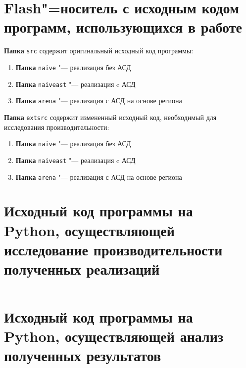 \section{Flash"=носитель с исходным кодом программ, использующихся в работе}
{\raggedright
\textbf{Папка} \texttt{src} содержит оригинальный исходный код программы:
}

\begin{enumerate}
    \item[] \textbf{Папка} \texttt{naive} "--- реализация без АСД
    \item[] \textbf{Папка} \texttt{naiveast} "--- реализация c АСД
    \item[] \textbf{Папка} \texttt{arena} "--- реализация с АСД на основе 
    региона
\end{enumerate}

{\raggedright
\textbf{Папка} \texttt{extsrc} содержит измененный исходный код, необходимый для
исследования производительности:
}

\begin{enumerate}
    \item[] \textbf{Папка} \texttt{naive} "--- реализация без АСД
    \item[] \textbf{Папка} \texttt{naiveast} "--- реализация c АСД
    \item[] \textbf{Папка} \texttt{arena} "--- реализация с АСД на основе 
    региона
\end{enumerate}
\label{app:A}

\section{Исходный код программы на Python, осуществляющей исследование
производительности полученных реализаций}
\inputminted{python}{requirements/src/test.py}
\label{app:B}

\section{Исходный код программы на Python, осуществляющей анализ полученных 
результатов}
\inputminted{python}{requirements/src/graph.py}
\label{app:C}